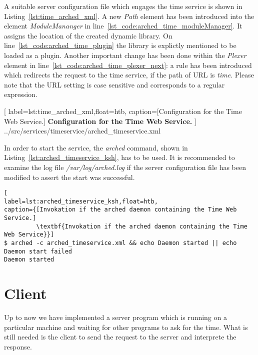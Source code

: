 A suitable server configuration file which engages the time service is shown in Listing~\ref{lst:time_arched_xml}.
A new \textit{Path} element has been introduced into the element \textit{ModuleMananger} in line~\ref{lst_code:arched_time_moduleManager}.
It assigns the location of the created dynamic library.
On line~\ref{lst_code:arched_time_plugin} the library is explictly mentioned to be loaded as a plugin.
Another important change has been done within the \textit{Plexer} element in line~\ref{lst_code:arched_time_plexer_next}:
a rule has been introduced which redirects the request to the time service, if the path of URL is \textit{time}. 
Please note that the URL setting is case sensitive and corresponds to a regular expression.\\


	[
	label=lst:time_arched_xml,float=htb,
	caption={[Configuration for the Time Web Service.]
	\textbf{Configuration for the Time Web Service.}}
	]
{../src/services/timeservice/arched_timeservice.xml}

In order to start the service, the \textit{arched} command, shown in Listing~\ref{lst:arched_timeservice_ksh}, has to be used.
It is recommended to examine the log file \textit{/var/log/arched.log} if the server configuration file has been modified to  assert the start was successful.

\begin{lstlisting}[
label=lst:arched_timeservice_ksh,float=htb,
caption={[Invokation if the arched daemon containing the Time Web Service.]
         \textbf{Invokation if the arched daemon containing the Time Web Service}}]
$ arched -c arched_timeservice.xml && echo Daemon started || echo Daemon start failed
Daemon started
\end{lstlisting}



\section{Client}\label{sec:timeservice_client}

Up to now we have implemented a server program which is running on a particular machine and waiting for other programs to ask for the time. What is still needed is the client to send the request to the server and interprete the response.


